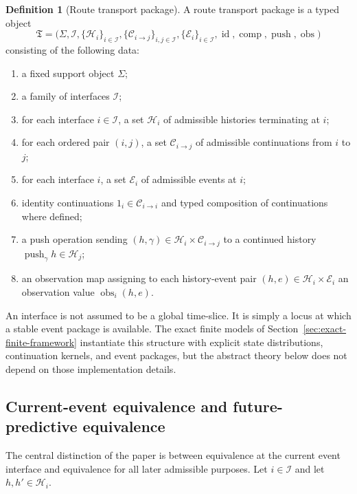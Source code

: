 \documentclass[11pt]{article}
\newcommand{\Histories}{\mathcal{H}}
\newcommand{\Interfaces}{\mathcal{I}}
\newcommand{\Support}{\Sigma}
\newcommand{\RouteTransport}{\mathfrak{T}}
\theoremstyle{definition}
\newtheorem{definition}[theorem]{Definition}
\begin{document}
\begin{definition}[Route transport package]\label{def:route-transport-package}
A route transport package is a typed object
\[
\RouteTransport=
\bigl(
\Support,\Interfaces,\{\Histories_i\}_{i\in\Interfaces},
\{\mathcal{C}_{i\to j}\}_{i,j\in\Interfaces},
\{\mathcal{E}_i\}_{i\in\Interfaces},
\operatorname{id},\operatorname{comp},\operatorname{push},\operatorname{obs}
\bigr)
\]
consisting of the following data:
\begin{enumerate}
\item a fixed support object $\Support$;
\item a family of interfaces $\Interfaces$;
\item for each interface $i\in\Interfaces$, a set $\Histories_i$ of admissible histories terminating at $i$;
\item for each ordered pair $(i,j)$, a set $\mathcal{C}_{i\to j}$ of admissible continuations from $i$ to $j$;
\item for each interface $i$, a set $\mathcal{E}_i$ of admissible events at $i$;
\item identity continuations $1_i\in\mathcal{C}_{i\to i}$ and typed composition of continuations where defined;
\item a push operation sending $(h,\gamma)\in \Histories_i\times \mathcal{C}_{i\to j}$ to a continued history $\operatorname{push}_{\gamma} h\in\Histories_j$;
\item an observation map assigning to each history-event pair $(h,e)\in\Histories_i\times\mathcal{E}_i$ an observation value $\operatorname{obs}_i(h,e)$.
\end{enumerate}
\end{definition}

An interface is not assumed to be a global time-slice. It is simply a locus at which a stable event package is available. The exact finite models of Section~\ref{sec:exact-finite-framework} instantiate this structure with explicit state distributions, continuation kernels, and event packages, but the abstract theory below does not depend on those implementation details.

\subsection{Current-event equivalence and future-predictive equivalence}\label{subsec:rtp-equivalences}
The central distinction of the paper is between equivalence at the current event interface and equivalence for all later admissible purposes. Let $i\in\Interfaces$ and let $h,h'\in\Histories_i$.
\end{document}
